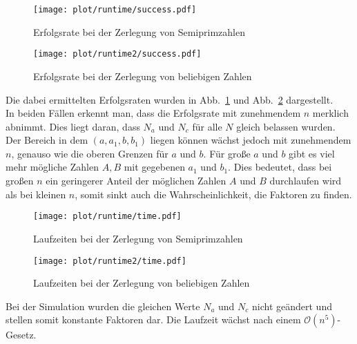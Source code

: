 \begin{figure}[!ht]
		\centering
		\texttt{[image: plot/runtime/success.pdf]}
		\caption{Erfolgsrate bei der Zerlegung von Semiprimzahlen}\label{fig:runtime-success}
\end{figure}

\begin{figure}[!ht]
		\centering
		\texttt{[image: plot/runtime2/success.pdf]}
		\caption{Erfolgsrate bei der Zerlegung von beliebigen Zahlen}\label{fig:runtime2-success}
\end{figure}

Die dabei ermittelten Erfolgsraten wurden in Abb.~\ref{fig:runtime-success} und Abb.~\ref{fig:runtime2-success} dargestellt. \\
In beiden Fällen erkennt man, dass die Erfolgsrate mit zunehmendem $n$ merklich abnimmt. Dies liegt daran, dass $N_a$ und $N_c$ für alle $N$ gleich belassen wurden. Der Bereich in dem $\left(a,a_1,b,b_1\right)$ liegen können wächst jedoch mit zunehmendem $n$, genauso wie die oberen Grenzen für $a$ und $b$. Für große $a$ und $b$ gibt es viel mehr mögliche Zahlen $A, B$ mit gegebenen $a_1$ und $b_1$. Dies bedeutet, dass bei großen $n$ ein geringerer Anteil der möglichen Zahlen $A$ und $B$ durchlaufen wird als bei kleinen $n$, somit sinkt auch die Wahrscheinlichkeit, die Faktoren zu finden.

\begin{figure}[!ht]
		\centering
		\texttt{[image: plot/runtime/time.pdf]}
		\caption{Laufzeiten bei der Zerlegung von Semiprimzahlen}\label{fig:runtime-runtime}
\end{figure}

\begin{figure}[!ht]
		\centering
		\texttt{[image: plot/runtime2/time.pdf]}
		\caption{Laufzeiten bei der Zerlegung von beliebigen Zahlen}\label{fig:runtime2-runtime}
\end{figure}

Bei der Simulation wurden die gleichen Werte $N_a$ und $N_c$ nicht geändert und stellen somit konstante Faktoren dar. Die Laufzeit wächst nach einem $\mathcal{O}\left(n^5\right)$-Gesetz.



